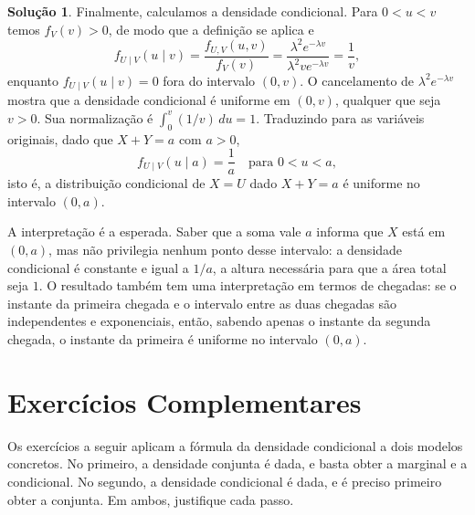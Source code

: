 \documentclass[12pt,portuguese]{article}
\theoremstyle{definition}
\theoremstyle{plainexercise}
\theoremstyle{starredexercise}
\theoremstyle{definition}
\newtheorem*{solution}{Solução}
\begin{document}
\begin{solution}
Finalmente, calculamos a densidade condicional. Para $0 < u < v$ temos $f_V(v) > 0$, de modo
que a definição se aplica e
\begin{equation}\label{eq:condicional-uniforme-661}
  f_{U\mid V}(u \mid v)
  = \frac{f_{U,V}(u,v)}{f_V(v)}
  = \frac{\lambda^2 e^{-\lambda v}}{\lambda^2 v e^{-\lambda v}}
  = \frac{1}{v},
\end{equation}
enquanto $f_{U\mid V}(u \mid v) = 0$ fora do intervalo $(0,v)$. O cancelamento de
$\lambda^2 e^{-\lambda v}$ mostra que a densidade condicional é uniforme em $(0,v)$, qualquer
que seja $v>0$. Sua normalização é $\int_0^v (1/v)\,du=1$.
Traduzindo para as variáveis originais, dado que $X+Y = a$ com $a > 0$,
\[
  f_{U\mid V}(u \mid a) = \frac{1}{a} \quad \text{para } 0 < u < a,
\]
isto é, a distribuição condicional de $X = U$ dado $X+Y = a$ é uniforme no intervalo $(0,a)$.

A interpretação é a esperada. Saber que a soma vale $a$ informa que $X$ está em $(0,a)$, mas
não privilegia nenhum ponto desse intervalo: a densidade condicional é constante e igual a
$1/a$, a altura necessária para que a área total seja $1$. O resultado também tem
uma interpretação em termos de chegadas: se o instante da primeira chegada
e o intervalo entre as duas chegadas são independentes e exponenciais, então, sabendo apenas
o instante da segunda chegada, o instante da primeira é uniforme no intervalo $(0,a)$.
\end{solution}

\section{Exercícios Complementares}\label{sec:exercicios-complementares}

Os exercícios a seguir aplicam a fórmula da densidade condicional a dois modelos concretos.
No primeiro, a densidade conjunta é dada, e basta obter a marginal e a condicional. No
segundo, a densidade condicional é dada, e é preciso primeiro obter a conjunta. Em ambos,
justifique cada passo.
\end{document}
